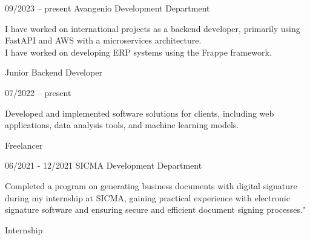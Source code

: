 \documentclass[9pt, blue]{./template/developercv} %
\begin{document}

\vspace{8pt}
\vspace{2.1mm}
\begin{entrylist}
	\entry
	{09/2023 -- present}
	{Avangenio}
	{Development Department}
	{
		\vspace{0.3mm}
		\begin{minipage}[t]{0.75\textwidth}
			\vspace{-\baselineskip}
			\itemmarker I have worked on international projects as a backend developer, primarily using FastAPI and AWS with a microservices architecture.\\
			\itemmarker I have worked on developing ERP systems using the Frappe framework.
		\end{minipage}

	}
	{Junior Backend Developer}


	\entry
	{07/2022 -- present}
	{}
	{}
	{
		\vspace{0.3mm}
		\begin{minipage}[t]{0.75\textwidth}
			\vspace{-\baselineskip}
			\itemmarker Developed and implemented software solutions for clients, including web applications, data analysis tools, and machine learning models.\\
		\end{minipage}

	}
	{Freelancer}


	\entry
	{06/2021 - 12/2021}
	{SICMA}
	{Development Department}
	{
		\vspace{0.3mm}
		\begin{minipage}[t]{0.75\textwidth}
			\vspace{-\baselineskip}
			\itemmarker Completed a program on generating business documents with digital signature during my internship at SICMA, gaining practical experience with electronic signature software and ensuring secure and efficient document signing processes."\\
 			\vspace{-3mm}
		\end{minipage}

	}
	{Internship}

\end{entrylist}
\end{document}
